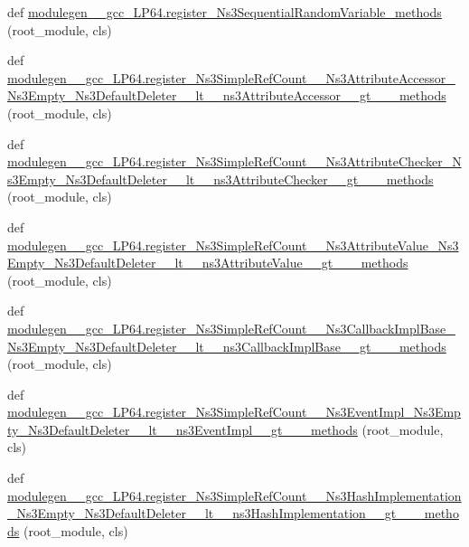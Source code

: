 \begin{DoxyCompactItemize}
\item 
def \hyperlink{namespacemodulegen____gcc__LP64_a96820d493e18dbe2fe013127aaf73ae8}{modulegen\+\_\+\+\_\+gcc\+\_\+\+L\+P64.\+register\+\_\+\+Ns3\+Sequential\+Random\+Variable\+\_\+methods} (root\+\_\+module, cls)
\item 
def \hyperlink{namespacemodulegen____gcc__LP64_a9b358364d845a1ffcabb6be20a325b9d}{modulegen\+\_\+\+\_\+gcc\+\_\+\+L\+P64.\+register\+\_\+\+Ns3\+Simple\+Ref\+Count\+\_\+\+\_\+\+Ns3\+Attribute\+Accessor\+\_\+\+Ns3\+Empty\+\_\+\+Ns3\+Default\+Deleter\+\_\+\+\_\+lt\+\_\+\+\_\+ns3\+Attribute\+Accessor\+\_\+\+\_\+gt\+\_\+\+\_\+\+\_\+methods} (root\+\_\+module, cls)
\item 
def \hyperlink{namespacemodulegen____gcc__LP64_acc11c420e32471422fd00230d89398af}{modulegen\+\_\+\+\_\+gcc\+\_\+\+L\+P64.\+register\+\_\+\+Ns3\+Simple\+Ref\+Count\+\_\+\+\_\+\+Ns3\+Attribute\+Checker\+\_\+\+Ns3\+Empty\+\_\+\+Ns3\+Default\+Deleter\+\_\+\+\_\+lt\+\_\+\+\_\+ns3\+Attribute\+Checker\+\_\+\+\_\+gt\+\_\+\+\_\+\+\_\+methods} (root\+\_\+module, cls)
\item 
def \hyperlink{namespacemodulegen____gcc__LP64_abcd5829b1993ba7d28274b9959f71417}{modulegen\+\_\+\+\_\+gcc\+\_\+\+L\+P64.\+register\+\_\+\+Ns3\+Simple\+Ref\+Count\+\_\+\+\_\+\+Ns3\+Attribute\+Value\+\_\+\+Ns3\+Empty\+\_\+\+Ns3\+Default\+Deleter\+\_\+\+\_\+lt\+\_\+\+\_\+ns3\+Attribute\+Value\+\_\+\+\_\+gt\+\_\+\+\_\+\+\_\+methods} (root\+\_\+module, cls)
\item 
def \hyperlink{namespacemodulegen____gcc__LP64_abad80b77479df17974cc787f14a2406f}{modulegen\+\_\+\+\_\+gcc\+\_\+\+L\+P64.\+register\+\_\+\+Ns3\+Simple\+Ref\+Count\+\_\+\+\_\+\+Ns3\+Callback\+Impl\+Base\+\_\+\+Ns3\+Empty\+\_\+\+Ns3\+Default\+Deleter\+\_\+\+\_\+lt\+\_\+\+\_\+ns3\+Callback\+Impl\+Base\+\_\+\+\_\+gt\+\_\+\+\_\+\+\_\+methods} (root\+\_\+module, cls)
\item 
def \hyperlink{namespacemodulegen____gcc__LP64_a0545c365b0db77cf144c477216b1292c}{modulegen\+\_\+\+\_\+gcc\+\_\+\+L\+P64.\+register\+\_\+\+Ns3\+Simple\+Ref\+Count\+\_\+\+\_\+\+Ns3\+Event\+Impl\+\_\+\+Ns3\+Empty\+\_\+\+Ns3\+Default\+Deleter\+\_\+\+\_\+lt\+\_\+\+\_\+ns3\+Event\+Impl\+\_\+\+\_\+gt\+\_\+\+\_\+\+\_\+methods} (root\+\_\+module, cls)
\item 
def \hyperlink{namespacemodulegen____gcc__LP64_a38845cc78a4819d6d5632f27e6fd34d9}{modulegen\+\_\+\+\_\+gcc\+\_\+\+L\+P64.\+register\+\_\+\+Ns3\+Simple\+Ref\+Count\+\_\+\+\_\+\+Ns3\+Hash\+Implementation\+\_\+\+Ns3\+Empty\+\_\+\+Ns3\+Default\+Deleter\+\_\+\+\_\+lt\+\_\+\+\_\+ns3\+Hash\+Implementation\+\_\+\+\_\+gt\+\_\+\+\_\+\+\_\+methods} (root\+\_\+module, cls)

\end{DoxyCompactItemize}
